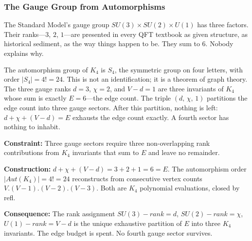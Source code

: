 \documentclass[11pt,a4paper]{book}
\def\cdot{.}%
\def\mathrm#1{#1}%
\def\texttt#1{#1}%
\def\text#1{#1}%
\begin{document}
\subsubsection*{The Gauge Group from Automorphisms}

The Standard Model's gauge group $\mathrm{SU}(3) \times \mathrm{SU}(2) \times \mathrm{U}(1)$ has three factors. Their ranks---$3$, $2$, $1$---are presented in every QFT textbook as given structure, as historical sediment, as the way things happen to be. They sum to $6$. Nobody explains why.

The automorphism group of $K_4$ is $S_4$, the symmetric group on four letters, with order $|S_4| = 4! = 24$. This is not an identification; it is a theorem of graph theory. The three gauge ranks $d = 3$, $\chi = 2$, and $V - d = 1$ are three invariants of $K_4$ whose sum is exactly $E = 6$---the edge count. The triple $(d,\, \chi,\, 1)$ partitions the edge count into three gauge sectors. After this partition, nothing is left: $d + \chi + (V-d) = E$ exhausts the edge count exactly. A fourth sector has nothing to inhabit.

\textbf{Constraint:} Three gauge sectors require three non-overlapping rank contributions from $K_4$ invariants that sum to $E$ and leave no remainder.

\textbf{Construction:} $d + \chi + (V - d) = 3 + 2 + 1 = 6 = E$. The automorphism order $|\mathrm{Aut}(K_4)| = 4! = 24$ reconstructs from consecutive vertex counts $V \cdot (V{-}1) \cdot (V{-}2) \cdot (V{-}3)$. Both are $K_4$ polynomial evaluations, closed by \texttt{refl}.

\textbf{Consequence:} The rank assignment $\mathrm{SU}(3)\text{-rank} = d$, $\mathrm{SU}(2)\text{-rank} = \chi$, $\mathrm{U}(1)\text{-rank} = V - d$ is the unique exhaustive partition of $E$ into three $K_4$ invariants. The edge budget is spent. No fourth gauge sector survives.
\end{document}
